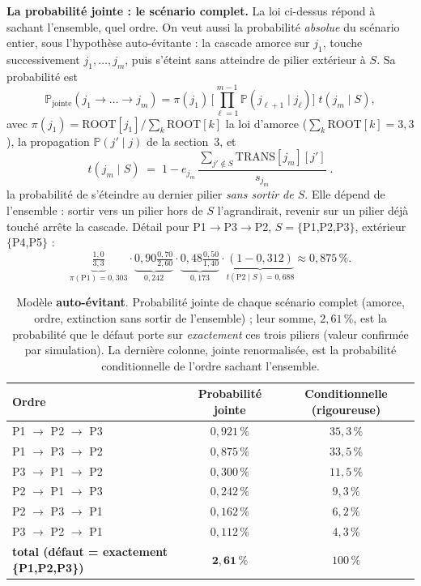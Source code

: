 \documentclass[11pt,a4paper]{article}
\begin{document}
\medskip
\noindent\textbf{La probabilité jointe : le scénario complet.} La loi ci-dessus répond à
\og{}sachant l'ensemble, quel ordre\fg{}. On veut aussi la probabilité \emph{absolue} du scénario
entier, sous l'hypothèse auto-évitante : \og{}la cascade amorce sur $j_1$, touche successivement
$j_1,\dots,j_m$, puis s'éteint sans atteindre de pilier extérieur à $S$\fg{}. Sa probabilité est
\begin{equation}
\mathbb P_{\text{jointe}}(j_1\to\dots\to j_m)
= \pi(j_1)\,\Big[\prod_{\ell=1}^{m-1}\mathbb P(j_{\ell+1}\mid j_\ell)\Big]\;t(j_m\mid S),
\end{equation}
avec $\pi(j_1)=\text{ROOT}[j_1]/\sum_k\text{ROOT}[k]$ la loi d'amorce ($\sum_k\text{ROOT}[k]=3{,}3$), la
propagation $\mathbb P(j'\mid j)$ de la section~3, et
\[
t(j_m\mid S)\;=\;1 - e_{j_m}\,\frac{\sum_{j'\notin S}\text{TRANS}[j_m][j']}{s_{j_m}}\;.
\]
la probabilité de s'éteindre au dernier pilier \emph{sans sortir de $S$}. Elle dépend de
l'ensemble : sortir vers un pilier hors de $S$ l'agrandirait, revenir sur un pilier déjà touché
arrête la cascade. Détail pour P1$\to$P3$\to$P2, $S=\{$P1,P2,P3$\}$, extérieur $\{$P4,P5$\}$ :
\[
\underbrace{\tfrac{1{,}0}{3{,}3}}_{\pi(\text{P1})=0{,}303}\cdot
\underbrace{0{,}90\tfrac{0{,}70}{2{,}60}}_{0{,}242}\cdot
\underbrace{0{,}48\tfrac{0{,}50}{1{,}40}}_{0{,}173}\cdot
\underbrace{(1-0{,}312)}_{t(\text{P2}\mid S)=0{,}688}
\approx 0{,}875\,\% .
\]

\begin{table}[h]\centering\small
\renewcommand{\arraystretch}{1.3}
\begin{tabular}{@{}lcc@{}}
\toprule
Ordre & Probabilité jointe & Conditionnelle (rigoureuse) \\
\midrule
\rowcolor{lightblue!40} P1 $\to$ P2 $\to$ P3 & $0{,}921\,\%$ & $35{,}3\,\%$ \\
P1 $\to$ P3 $\to$ P2 & $0{,}875\,\%$ & $33{,}5\,\%$ \\
P3 $\to$ P1 $\to$ P2 & $0{,}300\,\%$ & $11{,}5\,\%$ \\
P2 $\to$ P1 $\to$ P3 & $0{,}242\,\%$ & $9{,}3\,\%$ \\
P2 $\to$ P3 $\to$ P1 & $0{,}162\,\%$ & $6{,}2\,\%$ \\
P3 $\to$ P2 $\to$ P1 & $0{,}112\,\%$ & $4{,}3\,\%$ \\
\midrule
\textbf{total (défaut = exactement \{P1,P2,P3\})} & $\mathbf{2{,}61\,\%}$ & $100\,\%$ \\
\bottomrule
\end{tabular}
\caption{Modèle \textbf{auto-évitant}. Probabilité jointe de chaque scénario complet (amorce,
ordre, extinction sans sortir de l'ensemble) ; leur somme, $2{,}61\,\%$, est la probabilité que le
défaut porte sur \emph{exactement} ces trois piliers (valeur confirmée par simulation). La
dernière colonne, jointe renormalisée, est la probabilité conditionnelle de l'ordre sachant
l'ensemble.}
\end{table}
\end{document}
